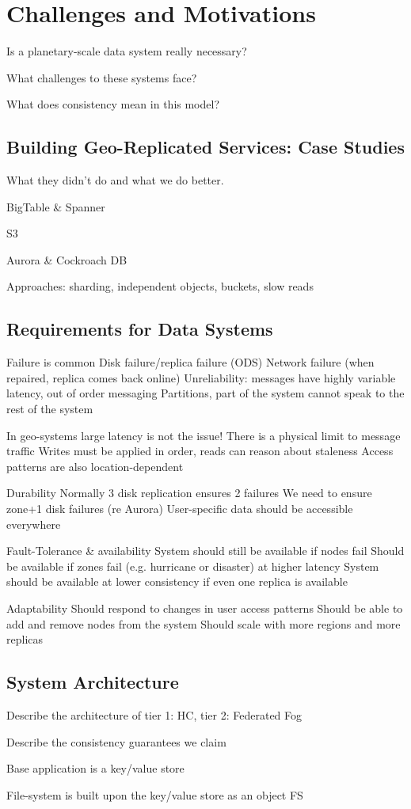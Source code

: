 
\renewcommand{\thechapter}{2}

\chapter{Challenges and Motivations}

Is a planetary-scale data system really necessary?

What challenges to these systems face?

What does consistency mean in this model?


\section{Building Geo-Replicated Services: Case Studies}

What they didn't do and what we do better.

BigTable \& Spanner

S3

Aurora \& Cockroach DB

Approaches: sharding, independent objects, buckets, slow reads

\section{Requirements for Data Systems}

Failure is common
    Disk failure/replica failure (ODS)
    Network failure (when repaired, replica comes back online)
    Unreliability: messages have highly variable latency, out of order messaging
    Partitions, part of the system cannot speak to the rest of the system

In geo-systems large latency is not the issue!
    There is a physical limit to message traffic
    Writes must be applied in order, reads can reason about staleness
    Access patterns are also location-dependent

Durability
    Normally 3 disk replication ensures 2 failures
    We need to ensure zone+1 disk failures (re Aurora)
    User-specific data should be accessible everywhere

Fault-Tolerance \& availability
    System should still be available if nodes fail
    Should be available if zones fail (e.g. hurricane or disaster) at higher latency
    System should be available at lower consistency if even one replica is available

Adaptability
    Should respond to changes in user access patterns
    Should be able to add and remove nodes from the system
    Should scale with more regions and more replicas

\section{System Architecture}

Describe the architecture of tier 1: HC, tier 2: Federated Fog

Describe the consistency guarantees we claim

Base application is a key/value store

File-system is built upon the key/value store as an object FS
